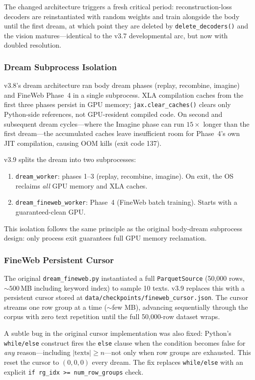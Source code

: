 The changed architecture triggers a fresh critical period: reconstruction-loss
decoders are reinstantiated with random weights and train alongside the body
until the first dream, at which point they are deleted by
\texttt{delete\_decoders()} and the vision matures---identical to the v3.7
developmental arc, but now with doubled resolution.

\subsubsection{Dream Subprocess Isolation}

v3.8's dream architecture ran body dream phases (replay, recombine, imagine)
and FineWeb Phase~4 in a single subprocess. XLA compilation caches from the
first three phases persist in GPU memory; \texttt{jax.clear\_caches()} clears
only Python-side references, not GPU-resident compiled code. On second and
subsequent dream cycles---where the Imagine phase can run $15{\times}$ longer
than the first dream---the accumulated caches leave insufficient room for
Phase~4's own JIT compilation, causing OOM kills (exit code 137).

v3.9 splits the dream into two subprocesses:
\begin{enumerate}
  \item \texttt{dream\_worker}: phases 1--3 (replay, recombine, imagine).
        On exit, the OS reclaims \emph{all} GPU memory and XLA caches.
  \item \texttt{dream\_fineweb\_worker}: Phase~4 (FineWeb batch training).
        Starts with a guaranteed-clean GPU.
\end{enumerate}
This isolation follows the same principle as the original body-dream subprocess
design: only process exit guarantees full GPU memory reclamation.

\subsubsection{FineWeb Persistent Cursor}

The original \texttt{dream\_fineweb.py} instantiated a full
\texttt{ParquetSource} (50,000 rows, ${\sim}500$\,MB including keyword index)
to sample 10 texts. v3.9 replaces this with a persistent cursor stored at
\texttt{data/checkpoints/fineweb\_cursor.json}. The cursor streams one row
group at a time (${\sim}$few MB), advancing sequentially through the corpus
with zero text repetition until the full 50,000-row dataset wraps.

A subtle bug in the original cursor implementation was also fixed: Python's
\texttt{while/else} construct fires the \texttt{else} clause when the
condition becomes false for \emph{any} reason---including $|\text{texts}| \geq
n$---not only when row groups are exhausted. This reset the cursor to
$(0, 0, 0)$ every dream. The fix replaces \texttt{while/else} with an
explicit \texttt{if rg\_idx >= num\_row\_groups} check.

